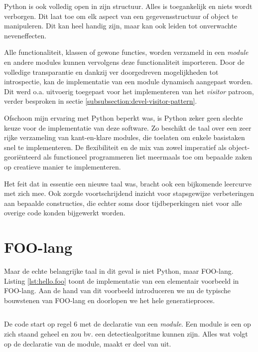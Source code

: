 Python is ook volledig open in zijn structuur. Alles is toegankelijk en niets
wordt verborgen. Dit laat toe om elk aspect van een gegevensstructuur of object
te manipuleren. Dit kan heel handig zijn, maar kan ook leiden tot onverwachte
neveneffecten.

Alle functionaliteit, klassen of gewone functies, worden verzameld in een
\emph{module} en andere modules kunnen vervolgens deze functionaliteit
importeren. Door de volledige transparantie en dankzij ver doorgedreven
mogelijkheden tot introspectie, kan de implementatie van een module dynamisch
aangepast worden. Dit werd o.a. uitvoerig toegepast voor het implementeren van
het \emph{visitor} patroon, verder besproken in sectie
\ref{subsubsection:devel-visitor-pattern}.

Ofschoon mijn ervaring met Python beperkt was, is Python zeker geen slechte
keuze voor de implementatie van deze software. Zo beschikt de taal over een
zeer rijke verzameling van kant-en-klare modules, die toelaten om enkele
basistaken snel te implementeren. De flexibiliteit en de mix van zowel
imperatief als object-geori\"enteerd als functioneel programmeren liet
meermaals toe om bepaalde zaken op creatieve manier te implementeren.

Het feit dat in essentie een nieuwe taal was, bracht ook een bijkomende
leercurve met zich mee. Ook zorgde voortschrijdend inzicht voor stapsgewijze
verbeteringen aan bepaalde constructies, die echter soms door tijdbeperkingen
niet voor alle overige code konden bijgewerkt worden.

\section{FOO-lang}
\label{section:devel-foo-lang}

Maar de echte belangrijke taal in dit geval is niet Python, maar FOO-lang.
Listing \ref{lst:hello.foo} toont de implementatie van een elementair voorbeeld
in FOO-lang. Aan de hand van dit voorbeeld introduceren we nu de typische
bouwstenen van FOO-lang en doorlopen we het hele generatieproces.

\inputminted[linenos,frame=lines,framesep=2mm,fontsize=\footnotesize]{js}{../src/foo-lang/examples/hello.foo}
\vspace{-5mm}
\vspace{3mm}

De code start op regel 6 met de declaratie van een \emph{module}. Een module is
een op zich staand geheel en zou bv. een detectiealgoritme kunnen zijn. Alles
wat volgt op de declaratie van de module, maakt er deel van uit.

